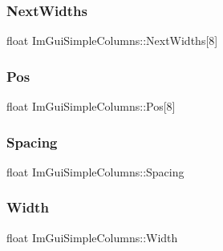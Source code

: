 \subsubsection{\texorpdfstring{Next\+Widths}{NextWidths}}
{\footnotesize\ttfamily float Im\+Gui\+Simple\+Columns\+::\+Next\+Widths\mbox{[}8\mbox{]}}

\hypertarget{struct_im_gui_simple_columns_a3c13060fe3e4732512a663bb369f51d8}{}\label{struct_im_gui_simple_columns_a3c13060fe3e4732512a663bb369f51d8} 
\subsubsection{\texorpdfstring{Pos}{Pos}}
{\footnotesize\ttfamily float Im\+Gui\+Simple\+Columns\+::\+Pos\mbox{[}8\mbox{]}}

\hypertarget{struct_im_gui_simple_columns_aee2a43067de182ca1aa1447c8b658935}{}\label{struct_im_gui_simple_columns_aee2a43067de182ca1aa1447c8b658935} 
\subsubsection{\texorpdfstring{Spacing}{Spacing}}
{\footnotesize\ttfamily float Im\+Gui\+Simple\+Columns\+::\+Spacing}

\hypertarget{struct_im_gui_simple_columns_a3b7ed6f3aa04e3ead1ea17e4d9f92767}{}\label{struct_im_gui_simple_columns_a3b7ed6f3aa04e3ead1ea17e4d9f92767} 
\subsubsection{\texorpdfstring{Width}{Width}}
{\footnotesize\ttfamily float Im\+Gui\+Simple\+Columns\+::\+Width}

